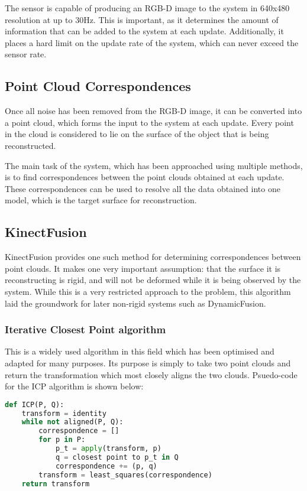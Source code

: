 \documentclass[a4paper]{article}
\begin{document}
The sensor is capable of producing an RGB-D image to the system in 640x480 resolution at up to 30Hz. This is important, as it determines the amount of information that can be added to the system at each update. Additionally, it places a hard limit on the update rate of the system, which can never exceed the sensor rate.

\subsection{Point Cloud Correspondences}

Once all noise has been removed from the RGB-D image, it can be converted into a point cloud, which forms the input to the system at each update. Every point in the cloud is considered to lie on the surface of the object that is being reconstructed. 

The main task of the system, which has been approached using multiple methods, is to find correspondences between the point clouds obtained at each update. These correspondences can be used to resolve all the data obtained into one model, which is the target surface for reconstruction.


\subsection{KinectFusion}

KinectFusion provides one such method for determining correspondences between point clouds. It makes one very important assumption: that the surface it is reconstructing is rigid, and will not be deformed while it is being observed by the system. While this is a very restricted approach to the problem, this algorithm laid the groundwork for later non-rigid systems such as DynamicFusion.

\subsubsection{Iterative Closest Point algorithm}
This is a widely used algorithm in this field which has been optimised and adapted for many purposes. Its purpose is simply to take two point clouds and return the transformation which most closely aligns the two clouds.
Psuedo-code for the ICP algorithm is shown below:

\begin{lstlisting}[language=Python]
def ICP(P, Q):
    transform = identity
    while not aligned(P, Q):
        correspondence = []
        for p in P:
            p_t = apply(transform, p)
            q = closest point to p_t in Q
            correspondence += (p, q)
        transform = least_squares(correspondence)
    return transform
\end{lstlisting}
\end{document}
